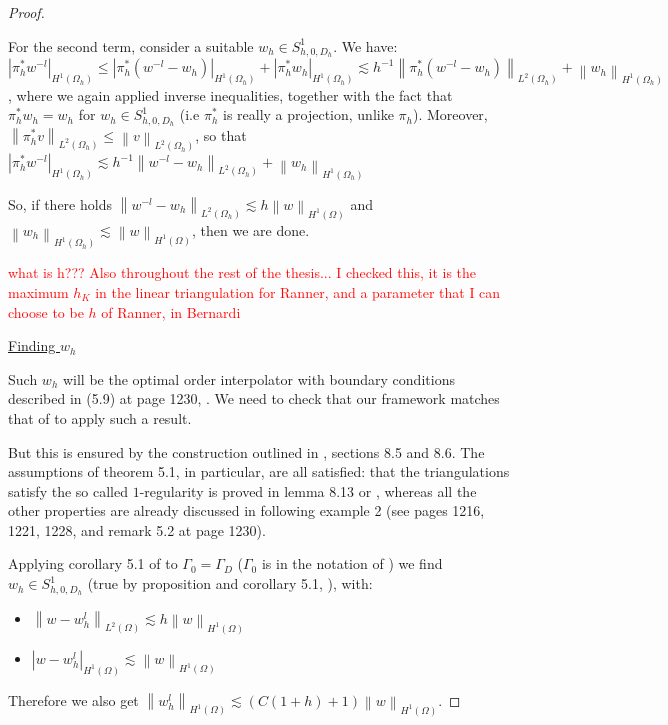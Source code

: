 \documentclass[english,a4paper,9pt,oneside]{scrbook}	%
\theoremstyle{break}
\newenvironment{mproof}[1][\proofname]{%
  \begin{proof}[#1]$ $\par\nobreak\ignorespaces
}{%
  \end{proof}
}
\renewcommand*{\proofname}{Proof}
\theoremstyle{remark}
\newcommand{\norm}[1]{\left\lVert#1\right\rVert}
\begin{document}
\begin{appendices}
\begin{mproof}
For the second term, consider a suitable $w_h \in S^{1}_{h,0,D_h}$. We have: $|\pi_h^* w^{-l}|_{H^1(\Omega_h)}\leq |\pi_h^* (w^{-l}-w_h)|_{H^1(\Omega_h)} +|\pi_h^* w_h|_{H^1(\Omega_h)}\lesssim h^{-1}\norm{\pi_h^*(w^{-l}-w_h)}_{L^2(\Omega_h)} +\norm{w_h}_{H^1(\Omega_h)}$, where we again applied inverse inequalities, together with the fact that $\pi_h^* w_h = w_h$ for $w_h \in S^1_{h,0,D_h}$ (i.e $\pi_h^*$ is really a projection, unlike $\pi_h$). Moreover, $\norm{\pi_h^* v}_{L^2(\Omega_h)}\leq \norm{v}_{L^2(\Omega_h)}$, so that $|\pi_h^* w^{-l}|_{H^1(\Omega_h)} \lesssim h^{-1}\norm{w^{-l}-w_h}_{L^2(\Omega_h)} +\norm{w_h}_{H^1(\Omega_h)}$

So, if there holds $\norm{w^{-l}-w_h}_{L^2(\Omega_h)}\lesssim h \norm{w}_{H^1(\Omega)}$ and $\norm{w_h}_{H^1(\Omega_h)}\lesssim \norm{w}_{H^1(\Omega)}$, then we are done.

\textcolor{red}{what is h??? Also throughout the rest of the thesis... I checked this, it is the maximum $h_K$ in the linear triangulation for Ranner, and a parameter that I can choose to be $h$ of Ranner, in Bernardi}

\underline{Finding $w_h$}

Such $w_h$ will be the optimal order interpolator with boundary conditions described in (5.9) at page 1230, \cite{bernardi}. We need to check that our framework matches that of \cite{bernardi} to apply such a result.

But this is ensured by the construction outlined in \cite{ranner}, sections 8.5 and 8.6. The assumptions of theorem 5.1, in particular, are all satisfied: that the triangulations satisfy the so called $1$-regularity is proved in lemma 8.13 or \cite{ranner}, whereas all the other properties are already discussed in \cite{bernardi} following example 2 (see pages 1216, 1221, 1228, and remark 5.2 at page 1230).

Applying corollary 5.1 of \cite{bernardi} to $\Gamma_0=\Gamma_D$ ($\Gamma_0$ is in the notation of \cite{bernardi}) we find $w_h \in S^{1}_{h,0,D_h}$ (true by proposition and corollary 5.1, \cite{bernardi}), with:

\begin{itemize}
	\item $\norm{w-w_h^l}_{L^2(\Omega)}\lesssim h \norm{w}_{H^1(\Omega)}$
	\item $|w-w_h^l|_{H^1(\Omega)}\lesssim \norm{w}_{H^1(\Omega)}$
\end{itemize}

Therefore we also get $\norm{w_h^l}_{H^1(\Omega)} \lesssim(C(1+h)+1)\norm{w}_{H^1(\Omega)}$.


\end{mproof}
\end{appendices}
\end{document}
